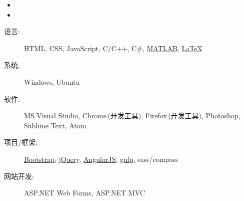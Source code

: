 \documentclass[letterpaper,11pt]{article}
\begin{document}
  \begin{itemize}
    \item
    \item
  \end{itemize}

  \begin{description}
    \item[语言:] HTML, CSS, JavaScript, C/C++, C\#, \href{http://cn.mathworks.com/products/matlab/}{MATLAB}, \href{http://www.latex-project.org/}{\LaTeX}
    \item[系统:] Windows, Ubuntu
    \item[软件:] MS Visual Studio, Chrome$\,$(开发工具), Firefox$\,$(开发工具), Photoshop, Sublime Text, Atom
    \item[项目/框架:] \href{http://www.bootcss.com/}{Bootstrap}, \href{https://jquery.com/}{jQuery}, \href{https://angularjs.org/}{AngularJS}, \href{http://gulpjs.com/}{gulp}, sass/compass
    \item[网站开发:] ASP.NET Web Forms, ASP.NET MVC
  \end{description}

\end{document}
